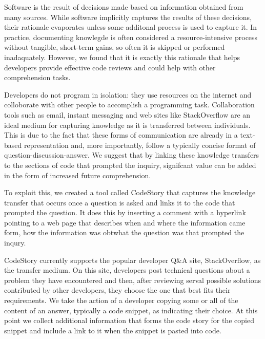 \documentclass[../manifest.tex]{subfiles}
\begin{document}
Software is the result of decisions made based on information obtained from many sources. While software implicitly captures the results of these decisions, their rationale evaporates unless some additonal process is used to capture it. In practice, documenting knowlegde is often considered a resource-intensive process without tangible, short-term gains, so often it is skipped or performed inadaquately\cite{OZ2008,NH2007}. However, we found that it is exactly this rationale that helps developers provide effective code reviews and could help with other comprehension tasks.

Developers do not program in isolation: they use resources on the internet and colloborate with other people to accomplish a programming task. Collaboration tools such as email, instant messaging and web sites like StackOverflow are an ideal medium for capturing knowledge as it is transferred between individuals. This is due to the fact that these forms of communication are already in a text-based representation and, more importantly, follow a typically concise format of question-discussion-answer. We suggest that by linking these knowledge transfers to the sections of code that prompted the inquiry, signifcant value can be added in the form of increased future comprehension.

To exploit this, we created a tool called CodeStory that captures the knowledge transfer that occurs once a question is asked and links it to the code that prompted the question. It does this by inserting a comment with a hyperlink pointing to a web page that describes when and where the information came form, how the information was obtwhat the question was that prompted the inqury.

CodeStory currently supports the popular developer Q\&A site, StackOverflow, as the transfer medium. On this site, developers post technical questions about a problem they have encountered and then, after reviewing serval possible solutions contributed by other developers, they choose the one that best fits their requirements. We take the action of a developer copying some or all of the content of an answer, typically a code snippet, as indicating their choice. At this point we collect additional information that forms the code story for the copied snippet and include a link to it when the snippet is pasted into code.
\end{document}
